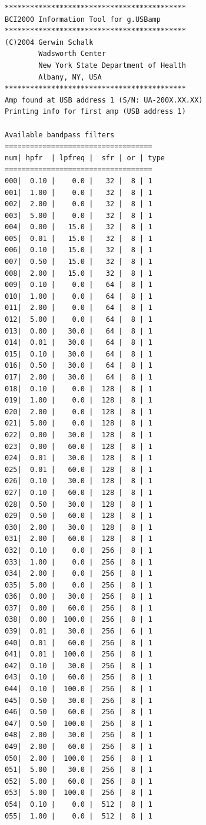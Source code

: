 \documentclass[letterpaper, oneside, 12pt]{article}
\begin{document}
\begin{verbatim}
*******************************************
BCI2000 Information Tool for g.USBamp
*******************************************
(C)2004 Gerwin Schalk
        Wadsworth Center
        New York State Department of Health
        Albany, NY, USA
*******************************************
Amp found at USB address 1 (S/N: UA-200X.XX.XX)
Printing info for first amp (USB address 1)

Available bandpass filters
===================================
num| hpfr  | lpfreq |  sfr | or | type
===================================
000|  0.10 |    0.0 |   32 |  8 | 1
001|  1.00 |    0.0 |   32 |  8 | 1
002|  2.00 |    0.0 |   32 |  8 | 1
003|  5.00 |    0.0 |   32 |  8 | 1
004|  0.00 |   15.0 |   32 |  8 | 1
005|  0.01 |   15.0 |   32 |  8 | 1
006|  0.10 |   15.0 |   32 |  8 | 1
007|  0.50 |   15.0 |   32 |  8 | 1
008|  2.00 |   15.0 |   32 |  8 | 1
009|  0.10 |    0.0 |   64 |  8 | 1
010|  1.00 |    0.0 |   64 |  8 | 1
011|  2.00 |    0.0 |   64 |  8 | 1
012|  5.00 |    0.0 |   64 |  8 | 1
013|  0.00 |   30.0 |   64 |  8 | 1
014|  0.01 |   30.0 |   64 |  8 | 1
015|  0.10 |   30.0 |   64 |  8 | 1
016|  0.50 |   30.0 |   64 |  8 | 1
017|  2.00 |   30.0 |   64 |  8 | 1
018|  0.10 |    0.0 |  128 |  8 | 1
019|  1.00 |    0.0 |  128 |  8 | 1
020|  2.00 |    0.0 |  128 |  8 | 1
021|  5.00 |    0.0 |  128 |  8 | 1
022|  0.00 |   30.0 |  128 |  8 | 1
023|  0.00 |   60.0 |  128 |  8 | 1
024|  0.01 |   30.0 |  128 |  8 | 1
025|  0.01 |   60.0 |  128 |  8 | 1
026|  0.10 |   30.0 |  128 |  8 | 1
027|  0.10 |   60.0 |  128 |  8 | 1
028|  0.50 |   30.0 |  128 |  8 | 1
029|  0.50 |   60.0 |  128 |  8 | 1
030|  2.00 |   30.0 |  128 |  8 | 1
031|  2.00 |   60.0 |  128 |  8 | 1
032|  0.10 |    0.0 |  256 |  8 | 1
033|  1.00 |    0.0 |  256 |  8 | 1
034|  2.00 |    0.0 |  256 |  8 | 1
035|  5.00 |    0.0 |  256 |  8 | 1
036|  0.00 |   30.0 |  256 |  8 | 1
037|  0.00 |   60.0 |  256 |  8 | 1
038|  0.00 |  100.0 |  256 |  8 | 1
039|  0.01 |   30.0 |  256 |  6 | 1
040|  0.01 |   60.0 |  256 |  8 | 1
041|  0.01 |  100.0 |  256 |  8 | 1
042|  0.10 |   30.0 |  256 |  8 | 1
043|  0.10 |   60.0 |  256 |  8 | 1
044|  0.10 |  100.0 |  256 |  8 | 1
045|  0.50 |   30.0 |  256 |  8 | 1
046|  0.50 |   60.0 |  256 |  8 | 1
047|  0.50 |  100.0 |  256 |  8 | 1
048|  2.00 |   30.0 |  256 |  8 | 1
049|  2.00 |   60.0 |  256 |  8 | 1
050|  2.00 |  100.0 |  256 |  8 | 1
051|  5.00 |   30.0 |  256 |  8 | 1
052|  5.00 |   60.0 |  256 |  8 | 1
053|  5.00 |  100.0 |  256 |  8 | 1
054|  0.10 |    0.0 |  512 |  8 | 1
055|  1.00 |    0.0 |  512 |  8 | 1

\end{verbatim}
\end{document}
